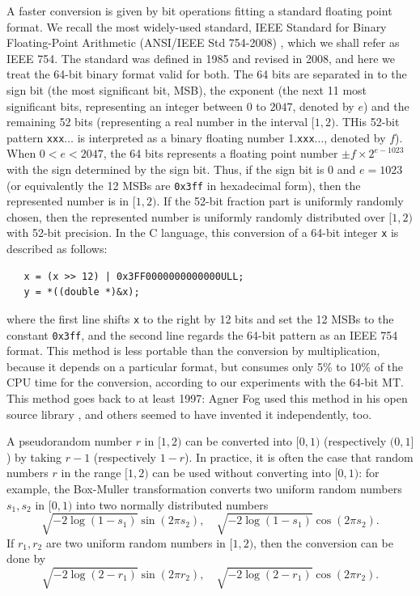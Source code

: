 \documentclass{svmult}
\begin{document}
A faster conversion is given by bit operations
fitting a standard floating point format. We recall
the most widely-used standard,
IEEE Standard for Binary Floating-Point Arithmetic (ANSI/IEEE Std
754-2008) \cite{ieee754}, which we shall refer as IEEE 754.
The standard was defined in 1985 and revised
in 2008, and here we treat the 64-bit binary format valid
for both.
The 64 bits are separated in to
the sign bit (the most significant bit, MSB),
the exponent (the next 11 most significant bits, representing
an integer between $0$ to $2047$, denoted by $e$)
and the remaining 52 bits (representing a real number in the interval $[1,2)$.
THis 52-bit pattern \texttt{xxx}$\ldots$ is interpreted
as a binary floating number 1.\texttt{xxx}$\ldots$,
denoted by $f$).
When $0<e<2047$, the 64 bits
represents a floating point number
$\pm f \times 2^{e - 1023}$ with the sign determined by the
sign bit.
Thus, if the sign bit is 0 and $e=1023$ (or equivalently
the 12 MSBs are \texttt{0x3ff} in hexadecimal form),
then the represented number is in $[1,2)$. If the 52-bit fraction part
is uniformly randomly chosen,
then the represented number is uniformly randomly distributed over $[1,2)$
with 52-bit precision.
In the C language, this conversion of a 64-bit integer \texttt{x} is described as follows:
\begin{verbatim}
   x = (x >> 12) | 0x3FF0000000000000ULL;
   y = *((double *)&x);
\end{verbatim}
where the first line shifts \texttt{x} to the right by 12 bits
and set the 12 MSBs to the constant \texttt{0x3ff},
and the second line regards the 64-bit pattern as an IEEE 754 format.
This method is less portable than the conversion by multiplication,
because it depends on a particular format,
but consumes only 5\% to 10\% of the CPU time for the conversion,
according to our experiments with the 64-bit MT.
This method goes back to at least 1997: Agner Fog used this method in
his open source library \cite{web:Fog}, and others seemed to have invented
it independently, too.

A pseudorandom number $r$ in $[1,2)$ can be converted into
$[0,1)$ (respectively $(0,1]$) by taking $r-1$ (respectively $1-r$).
In practice, it is often the case that
random numbers $r$ in the range $[1,2)$ can be used
without converting into $[0,1)$:
for example, the Box-Muller transformation
converts two uniform random numbers $s_1,s_2$ in $[0,1)$
into two normally distributed numbers
$$
\sqrt{-2 \log(1-s_1)}\sin (2 \pi s_2), \quad
\sqrt{-2 \log(1-s_1)}\cos (2 \pi s_2).
$$
If $r_1, r_2$ are two uniform random numbers in $[1,2)$,
then the conversion can be done by
$$
\sqrt{-2 \log(2-r_1)}\sin (2 \pi r_2), \quad
\sqrt{-2 \log(2-r_1)}\cos (2 \pi r_2).
$$
\end{document}

